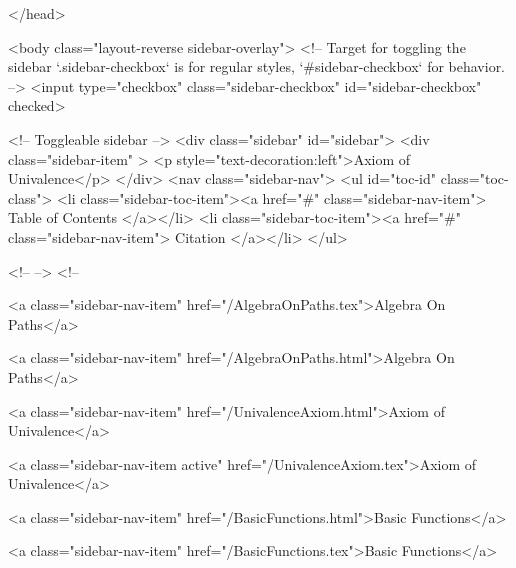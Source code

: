   
</head>




  <body class="layout-reverse sidebar-overlay">
    <!-- Target for toggling the sidebar `.sidebar-checkbox` is for regular
     styles, `#sidebar-checkbox` for behavior. -->
<input type="checkbox" class="sidebar-checkbox" id="sidebar-checkbox" checked>

<!-- Toggleable sidebar -->
<div class="sidebar" id="sidebar">
  <div class="sidebar-item" >
    <p style="text-decoration:left">Axiom of Univalence</p>
  </div>
  <nav class="sidebar-nav">
    <ul id="toc-id" class="toc-class">
  <li class="sidebar-toc-item"><a href="#" class="sidebar-nav-item"> Table of Contents </a></li>
  <li class="sidebar-toc-item"><a href="#" class="sidebar-nav-item"> Citation </a></li>
</ul>


    <!--  -->
    <!-- 
      
    
      
    
      
    
      
        
      
    
      
        
          <a class="sidebar-nav-item" href="/AlgebraOnPaths.tex">Algebra On Paths</a>
        
      
    
      
        
          <a class="sidebar-nav-item" href="/AlgebraOnPaths.html">Algebra On Paths</a>
        
      
    
      
        
          <a class="sidebar-nav-item" href="/UnivalenceAxiom.html">Axiom of Univalence</a>
        
      
    
      
        
          <a class="sidebar-nav-item active" href="/UnivalenceAxiom.tex">Axiom of Univalence</a>
        
      
    
      
        
          <a class="sidebar-nav-item" href="/BasicFunctions.html">Basic Functions</a>
        
      
    
      
        
          <a class="sidebar-nav-item" href="/BasicFunctions.tex">Basic Functions</a>
        
      
    
